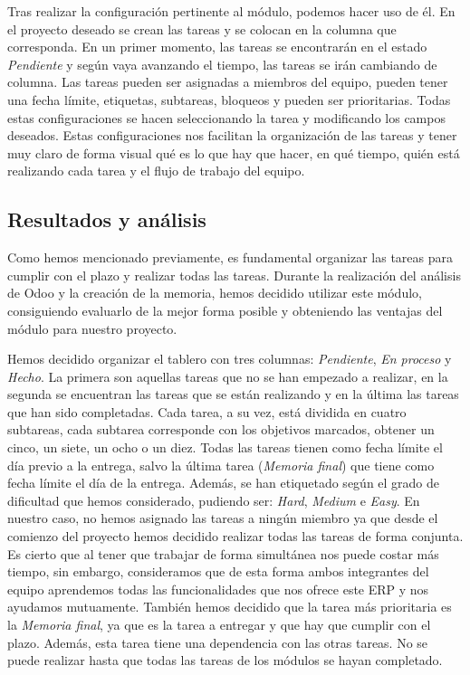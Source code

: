 Tras realizar la configuración pertinente al módulo, podemos hacer uso de él. En el proyecto deseado se crean las tareas y se colocan en la columna que corresponda. En un primer momento, las tareas se encontrarán en el estado \textit{Pendiente} y según vaya avanzando el tiempo, las tareas se irán cambiando de columna. Las tareas pueden ser asignadas a miembros del equipo, pueden tener una fecha límite, etiquetas, subtareas, bloqueos y pueden ser prioritarias. Todas estas configuraciones se hacen seleccionando la tarea y modificando los campos deseados. Estas configuraciones nos facilitan la organización de las tareas y tener muy claro de forma visual qué es lo que hay que hacer, en qué tiempo, quién está realizando cada tarea y el flujo de trabajo del equipo.

\subsection{Resultados y análisis}

Como hemos mencionado previamente, es fundamental organizar las tareas para cumplir con el plazo y realizar todas las tareas. Durante la realización del análisis de Odoo y la creación de la memoria, hemos decidido utilizar este módulo, consiguiendo evaluarlo de la mejor forma posible y obteniendo las ventajas del módulo para nuestro proyecto.

Hemos decidido organizar el tablero con tres columnas: \textit{Pendiente}, \textit{En proceso} y \textit{Hecho}. La primera son aquellas tareas que no se han empezado a realizar, en la segunda se encuentran las tareas que se están realizando y en la última las tareas que han sido completadas. Cada tarea, a su vez, está dividida en cuatro subtareas, cada subtarea corresponde con los objetivos marcados, obtener un cinco, un siete, un ocho o un diez. Todas las tareas tienen como fecha límite el día previo a la entrega, salvo la última tarea (\textit{Memoria final}) que tiene como fecha límite el día de la entrega. Además, se han etiquetado según el grado de dificultad que hemos considerado, pudiendo ser: \textit{Hard}, \textit{Medium} e \textit{Easy}. En nuestro caso, no hemos asignado las tareas a ningún miembro ya que desde el comienzo del proyecto hemos decidido realizar todas las tareas de forma conjunta. Es cierto que al tener que trabajar de forma simultánea nos puede costar más tiempo, sin embargo, consideramos que de esta forma ambos integrantes del equipo aprendemos todas las funcionalidades que nos ofrece este ERP y nos ayudamos mutuamente. También hemos decidido que la tarea más prioritaria es la \textit{Memoria final}, ya que es la tarea a entregar y que hay que cumplir con el plazo. Además, esta tarea tiene una dependencia con las otras tareas. No se puede realizar hasta que todas las tareas de los módulos se hayan completado.

